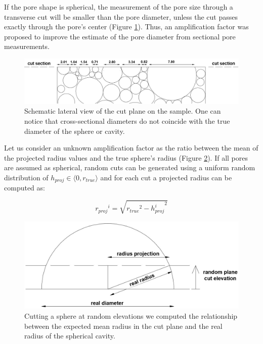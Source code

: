 \documentclass[review]{elsarticle}
\begin{document}
If the pore shape is spherical, the measurement of the pore size through a transverse cut will be smaller than the pore diameter, unless the cut passes exactly through the pore's center (Figure \ref{FoamCutPlane}). Thus, an amplification factor was proposed to improve the estimate of the pore diameter from sectional pore measurements.

\begin{figure}[htbp]
	\begin{center}
		\includegraphics[width=0.95\linewidth]{Tex-Figures/Fig04.png}
		\caption{Schematic lateral view of the cut plane on the sample. One can notice that cross-sectional diameters do not coincide with the true diameter of the sphere or cavity.}
		\label{FoamCutPlane}
	\end{center}
\end{figure}

Let us consider an unknown amplification factor as the ratio between the mean of the projected radius values and the true sphere's radius (Figure \ref{RandomPlaneCut}). If all pores are assumed as spherical, random cuts can be generated using a uniform random distribution of $h_{proj} \in \langle 0,r_{true} \rangle$ and for each cut a projected radius can be computed as:

\begin{equation}\label{Eq11}
{r_{proj}}^i=\sqrt{{r_{true}}^2-{h_{proj}^i}^2}
\end{equation}

\begin{figure}[htbp]
	\begin{center}
		\includegraphics[width=0.75\linewidth]{Tex-Figures/Fig05.png}
		\caption{Cutting a sphere at random elevations we computed the relationship between the expected mean radius in the cut plane and the real radius of the spherical cavity.}
		\label{RandomPlaneCut}
	\end{center}
\end{figure}
\end{document}
